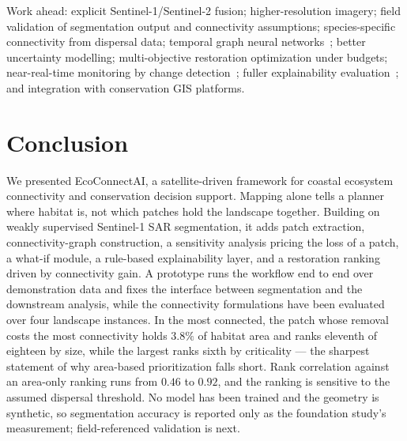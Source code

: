 \documentclass[conference]{IEEEtran}
\begin{document}
Work ahead: explicit Sentinel-1/Sentinel-2 fusion; higher-resolution imagery; field validation of segmentation output and connectivity assumptions; species-specific connectivity from dispersal data; temporal graph neural networks~\cite{liu2022hybrid}; better uncertainty modelling; multi-objective restoration optimization under budgets; near-real-time monitoring by change detection~\cite{yu2025changedetection,naceur2025unet}; fuller explainability evaluation~\cite{klotz2025xai}; and integration with conservation GIS platforms.


\section{Conclusion}

We presented EcoConnectAI, a satellite-driven framework for coastal ecosystem connectivity and conservation decision support. Mapping alone tells a planner where habitat is, not which patches hold the landscape together. Building on weakly supervised Sentinel-1 SAR segmentation, it adds patch extraction, connectivity-graph construction, a sensitivity analysis pricing the loss of a patch, a what-if module, a rule-based explainability layer, and a restoration ranking driven by connectivity gain. A prototype runs the workflow end to end over demonstration data and fixes the interface between segmentation and the downstream analysis, while the connectivity formulations have been evaluated over four landscape instances. In the most connected, the patch whose removal costs the most connectivity holds $3.8\%$ of habitat area and ranks eleventh of eighteen by size, while the largest ranks sixth by criticality --- the sharpest statement of why area-based prioritization falls short. Rank correlation against an area-only ranking runs from $0.46$ to $0.92$, and the ranking is sensitive to the assumed dispersal threshold. No model has been trained and the geometry is synthetic, so segmentation accuracy is reported only as the foundation study's measurement; field-referenced validation is next.

\end{document}
